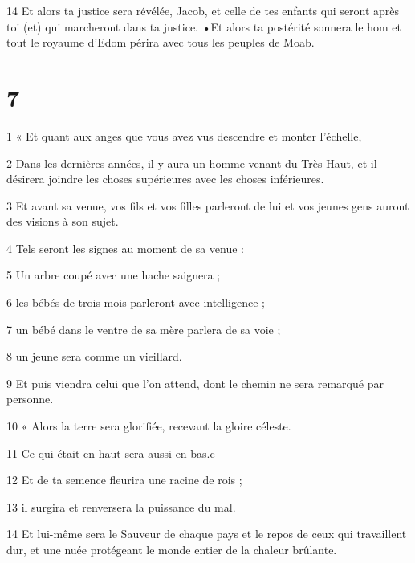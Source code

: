 \par 14 Et alors ta justice sera révélée, Jacob, et celle de tes enfants qui seront après toi (et) qui marcheront dans ta justice. •Et alors ta postérité sonnera le hom et tout le royaume d'Edom périra avec tous les peuples de Moab.

\chapter{7}

\par 1 « Et quant aux anges que vous avez vus descendre et monter l’échelle,

\par 2 Dans les dernières années, il y aura un homme venant du Très-Haut, et il désirera joindre les choses supérieures avec les choses inférieures.

\par 3 Et avant sa venue, vos fils et vos filles parleront de lui et vos jeunes gens auront des visions à son sujet.

\par 4 Tels seront les signes au moment de sa venue :

\par 5 Un arbre coupé avec une hache saignera ;

\par 6 les bébés de trois mois parleront avec intelligence ;

\par 7 un bébé dans le ventre de sa mère parlera de sa voie ;

\par 8 un jeune sera comme un vieillard.

\par 9 Et puis viendra celui que l'on attend, dont le chemin ne sera remarqué par personne.

\par 10 « Alors la terre sera glorifiée, recevant la gloire céleste.

\par 11 Ce qui était en haut sera aussi en bas.c

\par 12 Et de ta semence fleurira une racine de rois ;

\par 13 il surgira et renversera la puissance du mal.

\par 14 Et lui-même sera le Sauveur de chaque pays et le repos de ceux qui travaillent dur, et une nuée protégeant le monde entier de la chaleur brûlante.

